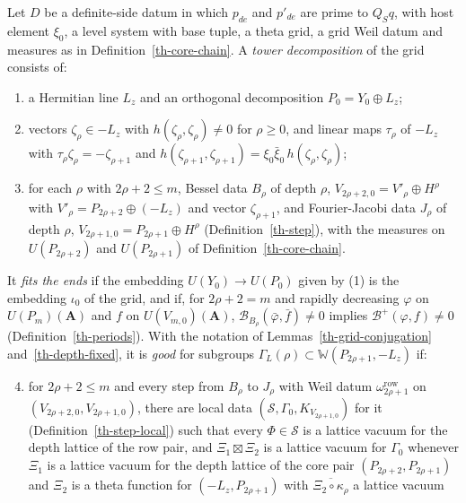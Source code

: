 \begin{definition}\label{th-tower-decomposition}
Let $D$ be a definite-side datum in which $p_{de}$ and $p'_{de}$ are prime to
$Q_Sq$, with host element $\xi_0$, a level system with base tuple, a theta grid,
a grid Weil datum and measures as in Definition~\ref{th-core-chain}. A
\emph{tower decomposition} of the grid consists of:
\begin{enumerate}
\item a Hermitian line $L_z$ and an orthogonal decomposition $P_0=Y_0\oplus L_z$;
\item vectors $\zeta_\rho\in-L_z$ with $h(\zeta_\rho,\zeta_\rho)\neq0$ for
  $\rho\geq0$, and linear maps $\tau_\rho$ of $-L_z$ with
  $\tau_\rho\zeta_\rho=-\zeta_{\rho+1}$ and
  $h(\zeta_{\rho+1},\zeta_{\rho+1})=\xi_0\bar\xi_0\,h(\zeta_\rho,\zeta_\rho)$;
\item for each $\rho$ with $2\rho+2\leq m$, Bessel data $B_\rho$ of depth $\rho$,
  $V_{2\rho+2,0}=V'_\rho\oplus H^\rho$ with $V'_\rho=P_{2\rho+2}\oplus(-L_z)$ and
  vector $\zeta_{\rho+1}$, and Fourier-Jacobi data $J_\rho$ of depth $\rho$,
  $V_{2\rho+1,0}=P_{2\rho+1}\oplus H^\rho$ (Definition~\ref{th-step}), with
  the measures on $U(P_{2\rho+2})$ and $U(P_{2\rho+1})$ of
  Definition~\ref{th-core-chain}.
\end{enumerate}
It \emph{fits the ends} if the embedding $U(Y_0)\to U(P_0)$ given by (1) is the
embedding $\iota_0$ of the grid, and if, for $2\rho+2=m$ and rapidly decreasing
$\varphi$ on $U(P_m)(\mathbf A)$ and $f$ on $U(V_{m,0})(\mathbf A)$,
$\mathcal B_{B_\rho}(\bar\varphi,\bar f)\neq0$ implies
$\mathcal B^+(\varphi,f)\neq0$ (Definition~\ref{th-periods}). With the notation
of Lemmas~\ref{th-grid-conjugation} and~\ref{th-depth-fixed}, it is \emph{good}
for subgroups $\Gamma_L(\rho)\subset\mathbb W(P_{2\rho+1},-L_z)$ if:
\begin{enumerate}\setcounter{enumi}{3}
\item for $2\rho+2\leq m$ and every step from $B_\rho$ to $J_\rho$ with Weil datum
  $\omega^{\mathrm{row}}_{2\rho+1}$ on $(V_{2\rho+2,0},V_{2\rho+1,0})$, there are
  local data $(\mathcal S,\Gamma_0,K_{V_{2\rho+1,0}})$ for it
  (Definition~\ref{th-step-local}) such that every $\Phi\in\mathcal S$ is a
  lattice vacuum for the depth lattice of the row pair, and
  $\Xi_1\boxtimes\Xi_2$ is a lattice vacuum for $\Gamma_0$ whenever $\Xi_1$ is a
  lattice vacuum for the depth lattice of the core pair
  $(P_{2\rho+2},P_{2\rho+1})$ and $\Xi_2$ is a theta function for
  $(-L_z,P_{2\rho+1})$ with $\overline{\Xi_2\circ\kappa_\rho}$ a lattice vacuum

\end{enumerate}
\end{definition}
